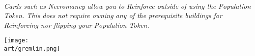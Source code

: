 \begin{multicols*}{2}
\bigskip

\begin{center}
  \\
  \footnotesize\textit{
    Cards such as Necromancy allow you to Reinforce outside of using the Population Token.
    This does not require owning any of the prerequisite buildings for Reinforcing nor flipping your Population Token.
  }
\end{center}

\vfill

\begin{center}
  \texttt{[image: \\art/gremlin.png]}
\end{center}

\vfill

\clearpage

\end{multicols*}
